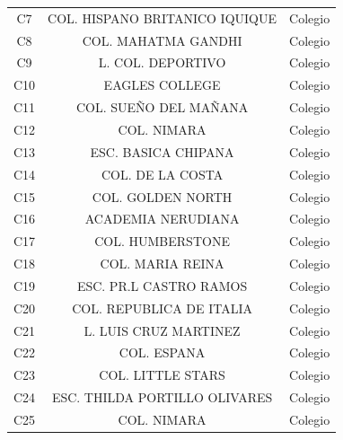 \documentclass[12pt,a4paper]{article}
\begin{document}
\begin{table}[htb!]
\begin{tabular}{|c|c|c|}
C7     & COL. HISPANO BRITANICO IQUIQUE   & Colegio     \\  
C8     & COL. MAHATMA GANDHI              & Colegio     \\  
C9     & L. COL. DEPORTIVO                & Colegio     \\  
C10    & EAGLES COLLEGE                   & Colegio     \\  
C11    & COL. SUEÑO DEL MAÑANA            & Colegio     \\  
C12    & COL. NIMARA                      & Colegio     \\  
C13    & ESC. BASICA CHIPANA              & Colegio     \\  
C14    & COL. DE LA COSTA                 & Colegio     \\  
C15    & COL. GOLDEN NORTH                & Colegio     \\  
C16    & ACADEMIA NERUDIANA               & Colegio     \\  
C17    & COL. HUMBERSTONE                 & Colegio     \\  
C18    & COL. MARIA REINA                 & Colegio     \\  
C19    & ESC. PR.L CASTRO RAMOS           & Colegio     \\  
C20    & COL. REPUBLICA DE ITALIA         & Colegio     \\  
C21    & L. LUIS CRUZ MARTINEZ            & Colegio     \\  
C22    & COL. ESPANA                      & Colegio     \\  
C23    & COL. LITTLE STARS                & Colegio     \\  
C24    & ESC. THILDA PORTILLO OLIVARES    & Colegio     \\  
C25    & COL. NIMARA                      & Colegio     \\  \hline
\end{tabular}
\end{table}
\end{document}
